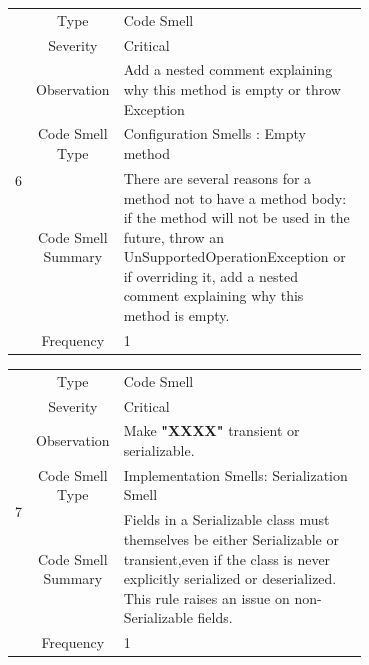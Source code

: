\documentclass[12pt,letterpaper]{report}
\begin{document}
\begin{table}
    \begin{tabular}{|c|c|p{0.7\linewidth}|}
    \hline   
    \multirow{6}{*}{6}
        & Type & Code Smell \\
    \cline{2-3}
        & Severity & Critical \\
    \cline{2-3}
       & Observation & Add a nested comment explaining why this method is empty or throw Exception \\
    \cline{2-3}
       & Code Smell Type & Configuration Smells : Empty method  \\
    \cline{2-3}
       & Code Smell Summary & There are several reasons for a method not to have a method body: if the method will not be used in the future, throw an UnSupportedOperationException or if overriding it, add a nested comment explaining why this method is empty. \\
    \cline{2-3}
       & Frequency & 1 \\
    \hline
    \end{tabular}
\end{table}

\begin{table}
    \begin{tabular}{|c|c|p{0.7\linewidth}|}
    \hline   
    \multirow{6}{*}{7}
        & Type & Code Smell \\
    \cline{2-3}
        & Severity & Critical \\
    \cline{2-3}
       & Observation & Make \textbf{"XXXX"} transient or serializable. \\
    \cline{2-3}
       & Code Smell Type & Implementation Smells: Serialization Smell  \\
    \cline{2-3}
       & Code Smell Summary & Fields in a Serializable class must themselves be either Serializable or transient,even if the class is never explicitly serialized or deserialized. This rule raises an issue on non-Serializable fields. \\
    \cline{2-3}
       & Frequency & 1 \\
    \hline
    \end{tabular}
\end{table}
\end{document}
